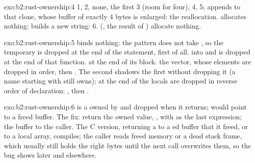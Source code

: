 \begin{solution}{exo:b2:rust-ownership:4}
 1,  2,  none, the first  3 (room for four),
 4,  5;  appends to that clone, whose buffer of exactly 4 bytes is
enlarged: the reallocation.  allocates nothing;  builds a new string: 6. 
(, the result of \code{+}) allocate nothing.
\end{solution}

\begin{solution}{exo:b2:rust-ownership:5}
 binds nothing: the pattern \code{_} does not take , so the temporary is dropped at
the end of the statement, first of all.   into  and is dropped at the end of that function.
 at the end of its block.   the vector, whose elements are dropped in order,  then
. The second  shadows the first without dropping it (a name starting with \code{_} still owns); at
the end of  the locals are dropped in reverse order of declaration: , then .
\end{solution}

\begin{solution}{exo:b2:rust-ownership:6}
 is a  owned by  and dropped when it returns;  would point to a
freed buffer. The fix: return the owned value, , with  as the
last expression; the buffer  to the caller. The C version, returning a  to a ed
buffer that it freed, or to a local array, compiles; the caller reads freed memory or a dead stack frame, which
usually still holds the right bytes until the next call overwrites them, so the bug shows later and elsewhere.
\end{solution}

